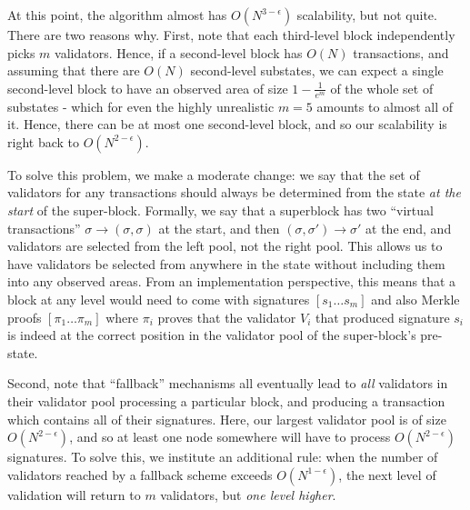\documentclass[11pt,a4paper]{report}
\theoremstyle{plain}
\theoremstyle{definition}
\theoremstyle{remark}
\begin{document}
At this point, the algorithm almost has $O(N^{3-\epsilon})$ scalability, but not quite. There are two reasons why. First, note that each third-level block independently picks $m$ validators. Hence, if a second-level block has $O(N)$ transactions, and assuming that there are $O(N)$ second-level substates, we can expect a single second-level block to have an observed area of size $1 - \frac{1}{e^m}$ of the whole set of substates - which for even the highly unrealistic $m = 5$ amounts to almost all of it. Hence, there can be at most one second-level block, and so our scalability is right back to $O(N^{2-\epsilon})$.

To solve this problem, we make a moderate change: we say that the set of validators for any transactions should always be determined from the state \emph{at the start} of the super-block. Formally, we say that a superblock has two ``virtual transactions'' $\sigma \rightarrow (\sigma, \sigma)$ at the start, and then $(\sigma, \sigma') \rightarrow \sigma'$ at the end, and validators are selected from the left pool, not the right pool. This allows us to have validators be selected from anywhere in the state without including them into any observed areas. From an implementation perspective, this means that a block at any level would need to come with signatures $[s_1 \ldots s_m]$ and also Merkle proofs $[\pi_1 \ldots \pi_m]$ where $\pi_i$ proves that the validator $V_i$ that produced signature $s_i$ is indeed at the correct position in the validator pool of the super-block's pre-state.

Second, note that ``fallback'' mechanisms all eventually lead to \emph{all} validators in their validator pool processing a particular block, and producing a transaction which contains all of their signatures. Here, our largest validator pool is of size $O(N^{2-\epsilon})$, and so at least one node somewhere will have to process $O(N^{2-\epsilon})$ signatures. To solve this, we institute an additional rule: when the number of validators reached by a fallback scheme exceeds $O(N^{1-\epsilon})$, the next level of validation will return to $m$ validators, but \emph{one level higher}.
\end{document}
